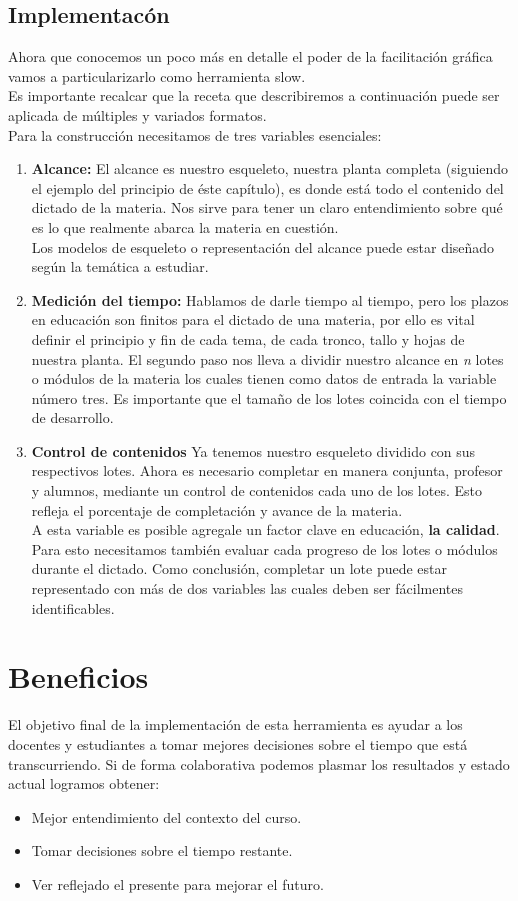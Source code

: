 \subsection{Implementac\'on}
Ahora que conocemos un poco m\'as en detalle el poder de la facilitaci\'on gr\'afica vamos a particularizarlo como herramienta slow.\\
Es importante recalcar que la receta que describiremos a continuaci\'on puede ser aplicada de m\'ultiples y variados formatos.\\
Para la construcci\'on necesitamos de tres variables esenciales:
\begin{enumerate}
 \item \textbf{Alcance:}
 El alcance es nuestro esqueleto, nuestra planta completa (siguiendo el ejemplo del principio de \'este cap\'itulo), es donde est\'a todo el contenido del 
 dictado de la materia. Nos sirve para tener un claro entendimiento sobre qu\'e es lo que realmente abarca la materia en cuesti\'on.\\
 Los modelos de esqueleto o representaci\'on del alcance puede estar dise\~nado seg\'un la tem\'atica a estudiar.
 \item \textbf{Medici\'on del tiempo:}
 Hablamos de darle tiempo al tiempo, pero los plazos en educaci\'on son finitos para el dictado de una materia, por ello es vital definir el principio y fin de 
 cada tema, de cada tronco, tallo y hojas de nuestra planta. El segundo paso nos lleva a dividir nuestro alcance en \textit{n} lotes o m\'odulos de la materia
 los cuales tienen como datos de entrada la variable n\'umero tres. Es importante que el tama\~no de los lotes coincida con el tiempo de desarrollo.
 \item \textbf{Control de contenidos}
 Ya tenemos nuestro esqueleto dividido con sus respectivos lotes. Ahora es necesario completar en manera conjunta, profesor y alumnos, mediante un control de 
 contenidos cada uno de los lotes. Esto refleja el porcentaje de completaci\'on y avance de la materia.\\
 A esta variable es posible agregale un factor clave en educaci\'on, \textbf{la calidad}. Para esto necesitamos tambi\'en evaluar cada progreso de los lotes o
 m\'odulos durante el dictado. Como conclusi\'on, completar un lote puede estar representado con m\'as de dos variables las cuales deben ser f\'acilmentes 
 identificables.
\end{enumerate}

\section{Beneficios}
El objetivo final de la implementaci\'on de esta herramienta es ayudar a los docentes y estudiantes a tomar mejores decisiones sobre el tiempo que est\'a
transcurriendo. Si de forma colaborativa podemos plasmar los resultados y estado actual logramos obtener:
\begin{itemize}
 \item Mejor entendimiento del contexto del curso.
 \item Tomar decisiones sobre el tiempo restante.
 \item Ver reflejado el presente para mejorar el futuro.
\end{itemize}

